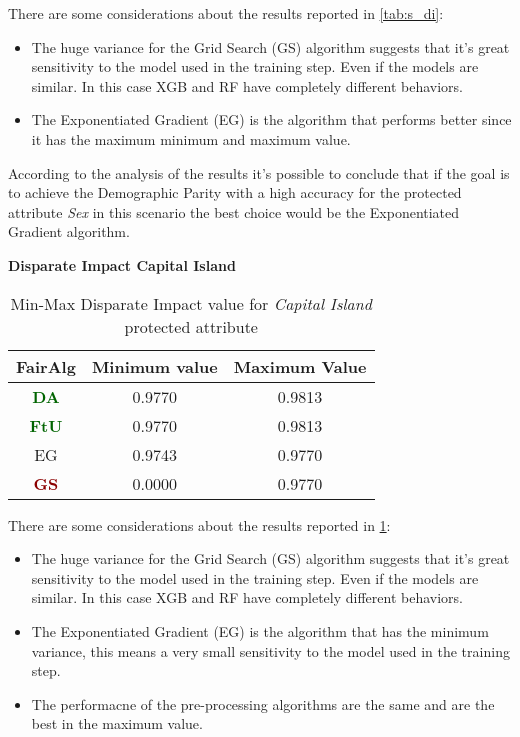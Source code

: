 There are some considerations about the results reported in \cref{tab:s_di}:

\begin{itemize}

    \item The huge variance for the Grid Search (GS) algorithm suggests that it's great sensitivity to the model used in the training step. Even if the models are similar. In this case XGB and RF have completely different behaviors.

    \item The Exponentiated Gradient (EG) is the algorithm that performs better since it has the maximum minimum and maximum value.

\end{itemize}

According to the analysis of the results it's possible to conclude that if the goal is to achieve the Demographic Parity with a high accuracy for the protected attribute \emph{Sex} in this scenario the best choice would be the Exponentiated Gradient algorithm.


\textbf{Disparate Impact Capital Island}
\begin{table}
    \centering
    \begin{tabular}{|c|c|c|}
        \hline
        \textbf{FairAlg} & \textbf{Minimum value} & \textbf{Maximum Value} \\
        \hline
        \textcolor{darkgreen}{\textbf{DA}} & 0.9770 & 0.9813 \\
        \hline
        \textcolor{darkgreen}{\textbf{FtU}} & 0.9770 & 0.9813 \\
        \hline
        EG & 0.9743 & 0.9770 \\
        \hline
        \textcolor{darkred}{\textbf{GS}} & 0.0000 & 0.9770 \\
        \hline
    \end{tabular}
    \caption{Min-Max Disparate Impact value for \emph{Capital Island} protected attribute}
    \label{tab:ci_di}
\end{table}

There are some considerations about the results reported in \cref{tab:ci_di}:

\begin{itemize}

    \item The huge variance for the Grid Search (GS) algorithm suggests that it's great sensitivity to the model used in the training step. Even if the models are similar. In this case XGB and RF have completely different behaviors.

    \item The Exponentiated Gradient (EG) is the algorithm that has the minimum variance, this means a very small sensitivity to the model used in the training step.

    \item The performacne of the pre-processing algorithms are the same and are the best in the maximum value.

\end{itemize}

